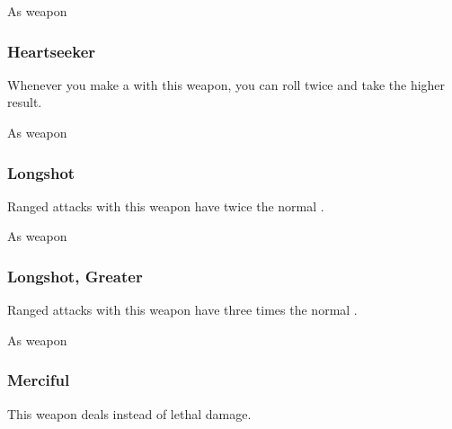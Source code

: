  


 As weapon


\lowercase{\hypertarget{item:Heartseeker}{}}\label{item:Heartseeker}
\hypertarget{item:Heartseeker}{\subsubsection{Heartseeker\hfill{}}}

Whenever you make a  with this weapon, you can roll twice and take the higher result.



 


 As weapon


\lowercase{\hypertarget{item:Longshot}{}}\label{item:Longshot}
\hypertarget{item:Longshot}{\subsubsection{Longshot\hfill{}}}

Ranged attacks with this weapon have twice the normal .



 


 As weapon


\lowercase{\hypertarget{item:Longshot, Greater}{}}\label{item:Longshot, Greater}
\hypertarget{item:Longshot, Greater}{\subsubsection{Longshot, Greater\hfill{}}}

Ranged attacks with this weapon have three times the normal .



 


 As weapon


\lowercase{\hypertarget{item:Merciful}{}}\label{item:Merciful}
\hypertarget{item:Merciful}{\subsubsection{Merciful\hfill{}}}

This weapon deals  instead of lethal damage.



